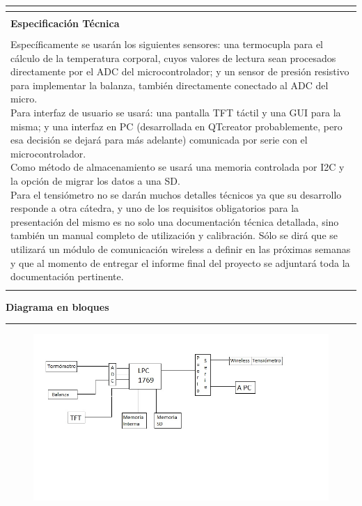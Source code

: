 \documentclass[5pt]{report}
\begin{document}
\begin{center}
\begin{adjustbox}{width=\textwidth}
\begin{tabular} {| c | c | c | c |}
	 				\multicolumn{4}{|c|}{  }\\
	 				\hline
					 \multicolumn {4}{c}{  }\\
					 \multicolumn{4}{l}{\scriptsize{\textbf{Especificación Técnica}}}\\
					 \hline 
					 \multicolumn {4}{|c|}{  }\\
					 \multicolumn {4}{|l|}{ \parbox{0.5\textwidth}{\scriptsize{Específicamente se usarán los siguientes sensores: una termocupla para el cálculo de la temperatura corporal, cuyos valores de lectura sean procesados directamente por el ADC del microcontrolador; y un sensor de presión resistivo para implementar la balanza, también directamente conectado al ADC del micro. \newline Para interfaz de usuario se usará: una pantalla TFT táctil y una GUI para la misma; y una interfaz en PC (desarrollada en QTcreator probablemente, pero esa decisión se dejará para más adelante) comunicada por serie con el microcontrolador. \newline Como método de almacenamiento se usará una memoria controlada por I2C y la opción de migrar los datos a una SD. \newline Para el tensiómetro no se darán muchos detalles técnicos ya que su desarrollo responde a otra cátedra, y uno de los requisitos obligatorios para la presentación del mismo es no solo una documentación técnica detallada, sino también un manual completo de utilización y calibración. Sólo se dirá que se utilizará un módulo de comunicación wireless a definir en las próximas semanas y que al momento de entregar el informe final del proyecto se adjuntará toda la documentación pertinente.  } }}\\
					 \multicolumn {4}{|c|}{  }\\
					 \hline
	 			\end{tabular}
	 		\end{adjustbox}
 	\end{center}
	 	\newpage 
	 	\Large{\textbf{Diagrama en bloques}}
	 	\hrule
	 	\begin{figure} [H]
		\centering
		\includegraphics[width=1.2\linewidth]{guiie}
		\label{fig:guiie}
		\end{figure}
		
\end{document}
